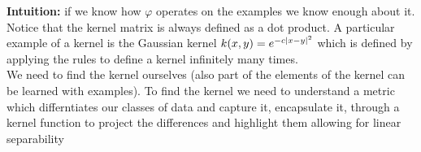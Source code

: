 \textbf{Intuition:} if we know how $\varphi$ operates on the examples we know enough about it.\\Notice that the kernel matrix is always defined as a dot product. A particular example of a kernel is the Gaussian kernel $ k(x,y) = e^{-c\left\lvert x-y\right\rvert^2}$ which is defined by applying the rules to define a kernel infinitely many times.\\
We need to find the kernel ourselves (also part of the elements of the kernel can be learned with examples). To find the kernel we need to understand a metric which differntiates our classes of data and capture it, encapsulate it, through a kernel function to project the differences and highlight them allowing for linear separability